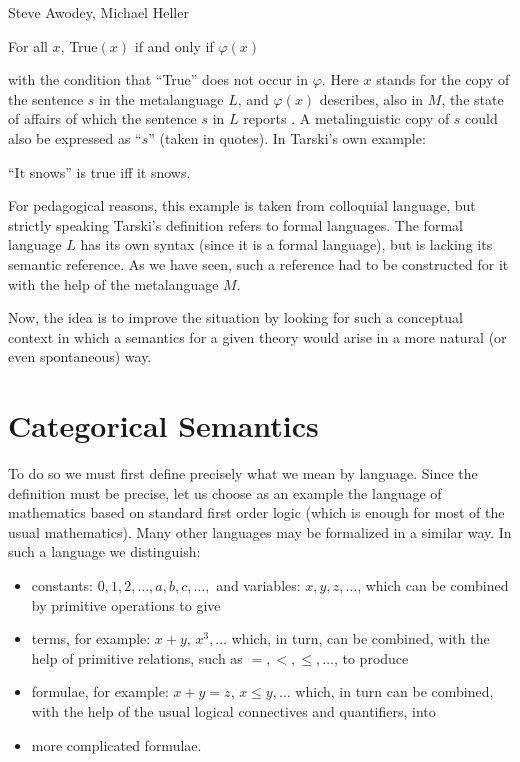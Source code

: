 \begin{artengenv2auth}{Steve Awodey, Michael Heller}
\begin{center}
For all $x$, True$(x)$ if and only if $\varphi (x)$
\end{center}
with the condition that ``True'' does not occur in $\varphi $. Here $x$ stands for the copy of the sentence $s$ in the metalanguage $L$, and $\varphi(x)$ describes, also in $M$, the state of affairs of which the sentence $s$ in $L$ reports \parencites[for more details see][]{Stanford}{Gila}. A metalinguistic copy of $s$ could also be expressed as ``$s$'' (taken in quotes). In Tarski's own example:
\begin{center}
``It snows'' is true iff it snows.
\end{center}
For pedagogical reasons, this example is taken from colloquial language, but strictly speaking Tarski's definition refers to formal languages. The formal language $L$ has its own syntax (since it is a formal language), but is lacking its semantic reference. As we have seen, such a reference had to be constructed for it with the help of the metalanguage $M$.

Now, the idea is to improve the situation by looking for such a conceptual context in which a semantics for a given theory would arise in a more natural (or even spontaneous) way.

\section{Categorical Semantics}
To do so we must first define precisely what we mean by language. Since the definition must be precise, let us choose as an example the language of mathematics based on standard first order logic (which is enough for most of the usual mathematics). Many other languages may be formalized in a similar way. In such a language we distinguish:
\begin{itemize}
\item constants: $0, 1, 2,\ldots , a, b, c,\ldots ,$ and variables: $x, y, z,\dots $, which can be combined by primitive operations to give
\item terms, for example: $x+y, \, x^3, \ldots $ which, in turn, can be combined, with the help of primitive relations, such as $=, <, \leq, \dots $, to produce
\item formulae, for example: $x+y = z, \, x \leq y,\ldots $ which, in turn can be combined, with the help of the usual logical connectives and quantifiers, into
\item more complicated formulae.
\end{itemize}


\end{artengenv2auth}
